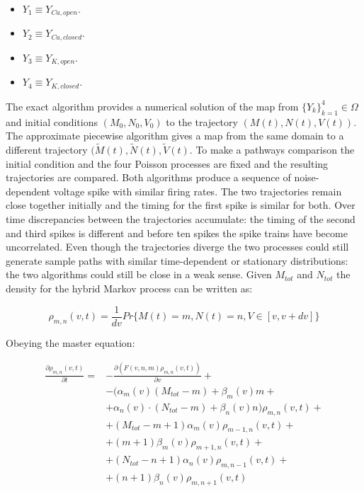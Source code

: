 \begin{multicols}{2}
	\begin{itemize}
		\item $Y_1 \equiv Y_{Ca, open}$.
		\item $Y_2 \equiv Y_{Ca, closed}$.
		\item $Y_3 \equiv Y_{K, open}$.
		\item $Y_4 \equiv Y_{K, closed}$.
	\end{itemize}
\end{multicols}

The exact algorithm provides a numerical solution of the map from $\{Y_k\}_{k=1}^4\in\Omega$ and initial conditions $(M_0, N_0, V_0)$ to the trajectory $(M(t), N(t), V(t))$.
The approximate piecewise algorithm gives a map from the same domain to a different trajectory $(\tilde{M}(t), \tilde{N}(t), \tilde{V}(t)$.
To make a pathways comparison the initial condition and the four Poisson processes are fixed and the resulting trajectories are compared.
Both algorithms produce a sequence of noise-dependent voltage spike with similar firing rates.
The two trajectories remain close together initially and the timing for the first spike is similar for both.
Over time discrepancies between the trajectories accumulate: the timing of the second and third spikes is different and before ten spikes the spike trains have become uncorrelated.
Even though the trajectories diverge the two processes could still generate sample paths with similar time-dependent or stationary distributions: the two algorithms could still be close in a weak sense.
Given $M_{tot}$ and $N_{tot}$ the density for the hybrid Markov process can be written as:

$$\rho_{m,n}(v,t) = \frac{1}{dv}Pr\{M(t) = m, N(t) = n, V\in[v, v+dv]\}$$

Obeying the master equation:

\begin{align*}
	\frac{\partial\rho_{m, n}(v, t)}{\partial t} =& - \frac{\partial(F(v, n, m)\rho_{m, n}(v, t))}{\partial v} +\\
																								&-(\alpha_m(v)(M_{tot}-m)+\beta_m(v)m+\\
																								&+\alpha_n(v)\cdot(N_{tot}-m)+\beta_n(v)n)\rho_{m, n}(v, t)+\\
																								&+(M_{tot}-m+1)\alpha_m(v)\rho_{m-1, n}(v, t)+\\
																								&+(m+1)\beta_m(v)\rho_{m+1, n}(v, t)+\\
																								&+(N_{tot}-n+1)\alpha_n(v)\rho_{m, n-1}(v,t)+\\
																								&+(n+1)\beta_n(v)\rho_{m, n+1}(v, t)
\end{align*}

